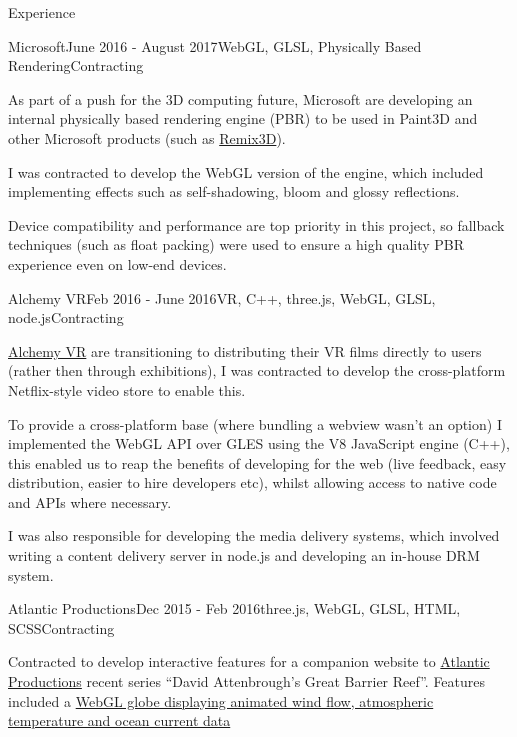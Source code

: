 \documentclass{resume} %
\begin{document}
\begin{rSection}{Experience}

\begin{rSubsection}{Microsoft}{June 2016 - August 2017}{WebGL, GLSL, Physically Based Rendering}{Contracting}
\item As part of a push for the 3D computing future, Microsoft are developing an internal physically based rendering engine (PBR) to be used in Paint3D and other Microsoft products (such as \href{http://remix3d.com/}{Remix3D}).
\item I was contracted to develop the WebGL version of the engine, which included implementing effects such as self-shadowing, bloom and glossy reflections.
\item Device compatibility and performance are top priority in this project, so fallback techniques (such as float packing) were used to ensure a high quality PBR experience even on low-end devices.
\end{rSubsection}

\begin{rSubsection}{Alchemy VR}{Feb 2016 - June 2016}{VR, C++, three.js, WebGL, GLSL, node.js}{Contracting}
\item \href{http://www.alchemyvr.com/}{Alchemy VR} are transitioning to distributing their VR films directly to users (rather then through exhibitions), I was contracted to develop the cross-platform Netflix-style video store to enable this.
\item To provide a cross-platform base (where bundling a webview wasn't an option) I implemented the WebGL API over GLES using the V8 JavaScript engine (C++), this enabled us to reap the benefits of developing for the web (live feedback, easy distribution, easier to hire developers etc), whilst allowing access to native code and APIs where necessary.
\item I was also responsible for developing the media delivery systems, which involved writing a content delivery server in node.js and developing an in-house DRM system.
\end{rSubsection}

\begin{rSubsection}{Atlantic Productions}{Dec 2015 - Feb 2016}{three.js, WebGL, GLSL, HTML, SCSS}{Contracting}
\item Contracted to develop interactive features for a companion website to \href{http://www.atlanticproductions.tv/}{Atlantic Productions} recent series ``David Attenbrough's Great Barrier Reef''. Features included a \href{http://attenboroughsreef.com/_mobile/interactive_weather_globe.php}{WebGL globe displaying animated wind flow, atmospheric temperature and ocean current data}
\end{rSubsection}


\end{rSection}
\end{document}
